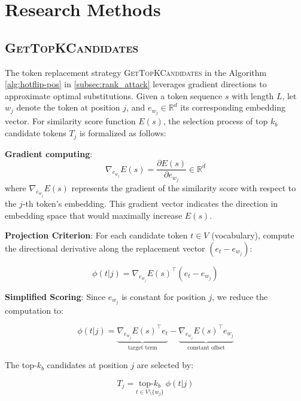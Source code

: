 \appendix
\newpage
\section{Research Methods}

\subsection{\textsc{GetTopKCandidates}}\label{app:hotflip}
The token replacement strategy \textsc{GetTopKCandidates} in the Algorithm \autoref{alg:hotflip-pos} in \autoref{subsec:rank_attack} leverages gradient directions to approximate optimal substitutions. Given a token sequence $s$ with length $L$, let $w_j$ denote the token at position $j$, and $e_{w_j} \in \mathbb{R}^d$ its corresponding embedding vector. For similarity score function $E(s)$, the selection process of top $k_b$ candidate tokens $T_j$ is formalized as follows:

\textbf{Gradient computing}:
\begin{equation}
    \nabla_{e_{w_j}} E(s) = \frac{\partial E(s)}{\partial e_{w_j}} \in \mathbb{R}^d
\end{equation}
where $\nabla_{e_{w_j}} E(s)$ represents the gradient of the similarity score with respect to the $j$-th token's embedding. This gradient vector indicates the direction in embedding space that would maximally increase $E(s)$.

\textbf{Projection Criterion}: For each candidate token $t \in V$ (vocabulary), compute the directional derivative along the replacement vector $(e_t - e_{w_j})$:

\begin{equation}
    \phi(t|j) = \nabla_{e_{w_j}} E(s)^\top (e_t - e_{w_j}) 
\end{equation}

\textbf{Simplified Scoring}: Since $e_{w_j}$ is constant for position $j$, we reduce the computation to:

\begin{equation}
    \phi(t|j) = \underbrace{\nabla_{e_{w_j}} E(s)^\top e_t}_{\text{target term}} - \underbrace{\nabla_{e_{w_j}} E(s)^\top e_{w_j}}_{\text{constant offset}}
\end{equation}

The top-$k_b$ candidates at position $j$ are selected by:

\begin{equation}
    T_j = \underset{t \in V\setminus\{w_j\}}{\text{top-}k_b} \ \phi(t|j)
\end{equation}


